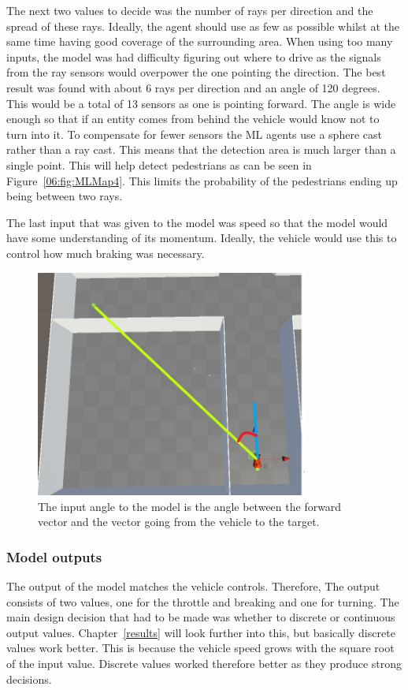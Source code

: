 The next two values to decide was the number of rays per direction and the spread of these rays. Ideally, the agent should use as few as possible whilst at the same time having good coverage of the surrounding area. When using too many inputs, the model was had difficulty figuring out where to drive as the signals from the ray sensors would overpower the one pointing the direction. The best result was found with about 6 rays per direction and an angle of 120 degrees. This would be a total of 13 sensors as one is pointing forward. The angle is wide enough so that if an entity comes from behind the vehicle would know not to turn into it. To compensate for fewer sensors the ML agents use a sphere cast rather than a ray cast. This means that the detection area is much larger than a single point. This will help detect pedestrians as can be seen in Figure~\ref{06:fig:MLMap4}. This limits the probability of the pedestrians ending up being between two rays.  

The last input that was given to the model was speed so that the model would have some understanding of its momentum. Ideally, the vehicle would use this to control how much braking was necessary. 

\begin{figure}[h]
    \centering
    \includegraphics[width=0.8\textwidth]{06_Implementation/00_MLAgents/Images/angle.jpg}
    \caption[Angle visualisation]{The input angle to the model is the angle between the forward vector and the vector going from the vehicle to the target.} \label{06:angleDrawing}
\end{figure}

\subsubsection{Model outputs}
The output of the model matches the vehicle controls. Therefore, The output consists of two values, one for the throttle and breaking and one for turning. The main design decision that had to be made was whether to discrete or continuous output values. Chapter~\ref{results} will look further into this, but basically discrete values work better. This is because the vehicle speed grows with the square root of the input value. Discrete values worked therefore better as they produce strong decisions. 


